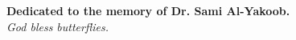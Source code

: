 \setcounter{page}{4}
\begin{dedication}

\vspace*{1.5in}
\begin{center}
\textbf{Dedicated to the memory of Dr. Sami Al-Yakoob.} \\
\vspace*{5mm}
\textit{God bless butterflies.}
\end{center}

\end{dedication}

